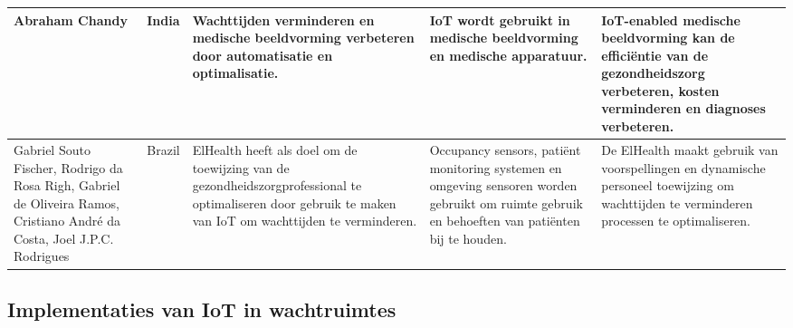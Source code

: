 \begin{table}[h]
\begin{tabularx}{\textwidth}{|p{1.7cm}|p{0.9cm}|p{3.5cm}|p{3.5cm}|X|}
        \hline
        Abraham Chandy
        & India 
        & Wachttijden verminderen en medische beeldvorming verbeteren door automatisatie en optimalisatie.
        & IoT wordt gebruikt in medische beeldvorming en medische apparatuur.
        & IoT-enabled medische beeldvorming kan de efficiëntie van de gezondheidszorg verbeteren, kosten verminderen en diagnoses verbeteren.    \\
        \hline
        Gabriel Souto Fischer,
        Rodrigo da Rosa Righ,
        Gabriel de Oliveira Ramos,
        Cristiano André da Costa,
        Joel J.P.C. Rodrigues
        & Brazil 
        & ElHealth heeft als doel om de toewijzing van de gezondheidszorgprofessional te optimaliseren door gebruik te maken van IoT om wachttijden te verminderen.
        & Occupancy sensors, patiënt monitoring systemen en omgeving sensoren worden gebruikt om ruimte gebruik en behoeften van patiënten bij te houden.
        & De ElHealth maakt gebruik van voorspellingen en dynamische personeel toewijzing om wachttijden te verminderen processen te optimaliseren.    \\
        \hline
    \end{tabularx}
    \label{tab:IoT_waiting_time_reduction_healthcare}
\end{table}

\subsection{Implementaties van IoT in wachtruimtes} \label{wachtruimte}

